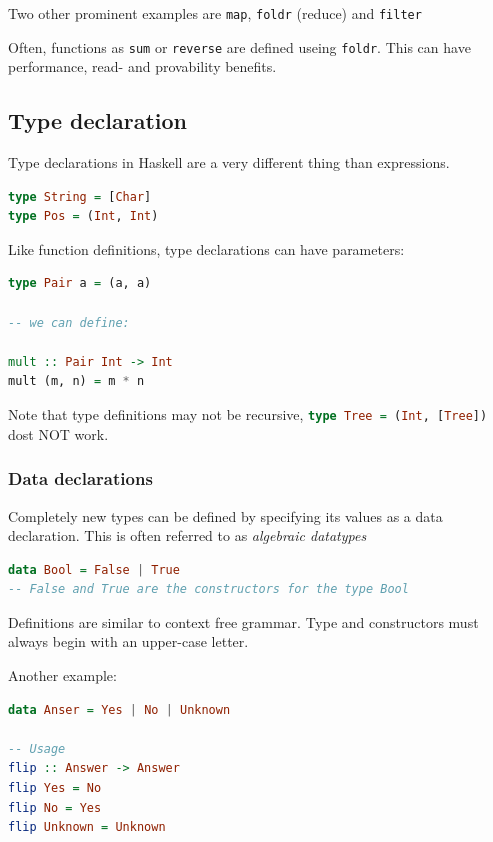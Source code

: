 Two other prominent examples are \lstinline|map|, \lstinline|foldr| (reduce) and \lstinline|filter|

Often, functions as \lstinline|sum| or \lstinline|reverse| are defined useing \lstinline|foldr|. This can have performance, read- and provability benefits.

\subsection{Type declaration}

Type declarations in Haskell are a very different thing than expressions.

\begin{lstlisting}[language=haskell]
type String = [Char]
type Pos = (Int, Int)
\end{lstlisting}

Like function definitions, type declarations can have parameters:
\begin{lstlisting}[language=haskell]
type Pair a = (a, a)

-- we can define:

mult :: Pair Int -> Int
mult (m, n) = m * n
\end{lstlisting}

Note that type definitions may not be recursive, \lstinline[language=haskell]|type Tree = (Int, [Tree])| dost NOT work.

\subsubsection{Data declarations}

Completely new types can be defined by specifying its values as a data declaration. This is often referred to as \emph{algebraic datatypes}
\begin{lstlisting}[language=haskell]
data Bool = False | True
-- False and True are the constructors for the type Bool
\end{lstlisting}

Definitions are similar to context free grammar. Type and constructors must always begin with an upper-case letter.

Another example:
\begin{lstlisting}[language=haskell]
data Anser = Yes | No | Unknown

-- Usage
flip :: Answer -> Answer
flip Yes = No
flip No = Yes
flip Unknown = Unknown
\end{lstlisting}

